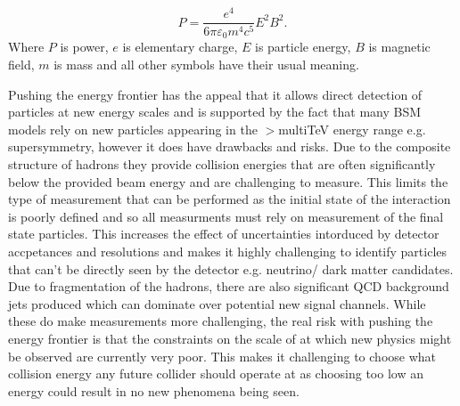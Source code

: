 \begin{equation}
\label{Eq:synchotron radiation}
P = \frac{e^4}{6\pi\varepsilon_0m^4c^5}E^2B^2.
\end{equation}
Where $P$ is power, $e$ is elementary charge, $E$ is particle energy, $B$ is magnetic field, $m$ is mass and all other symbols have their usual meaning.

Pushing the energy frontier has the appeal that it allows direct detection of particles at new energy scales and is supported by the fact that many \ac{BSM} models rely on new particles appearing in the $>$multiTeV energy range e.g. supersymmetry, however it does have drawbacks and risks. Due to the composite structure of hadrons they provide collision energies that are often significantly below the provided beam energy and are challenging to measure. This limits the type of measurement that can be performed as the initial state of the interaction is poorly defined and so all measurments must rely on measurement of the final state particles. This increases the effect of uncertainties intorduced by detector accpetances and resolutions and makes it highly challenging to identify particles that can't be directly seen by the detector e.g. neutrino/ dark matter candidates. Due to fragmentation of the hadrons, there are also significant \ac{QCD} background jets produced which can dominate over potential new signal channels. While these do make measurements more challenging, the real risk with pushing the energy frontier is that the constraints on the scale of at which new physics might be observed are currently very poor. This makes it challenging to choose what collision energy any future collider should operate at as choosing too low an energy could result in no new phenomena being seen.

